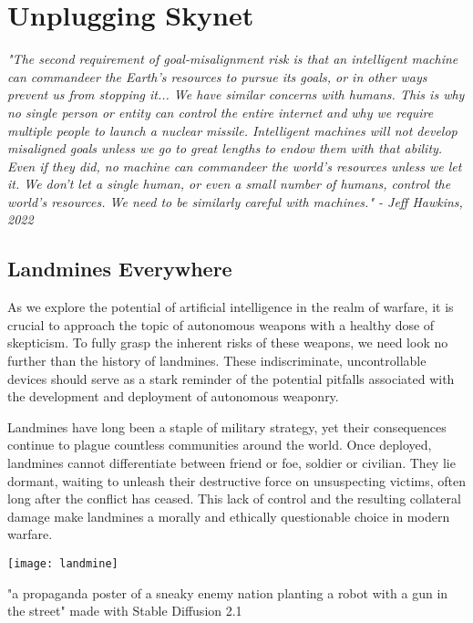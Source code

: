 \setchapterpreamble[u]{\margintoc}
\chapter{Unplugging Skynet}

\textit{"The second requirement of goal-misalignment risk is that an intelligent machine can commandeer the Earth's resources to pursue its goals, or in other ways prevent us from stopping it... We have similar concerns with humans. This is why no single person or entity can control the entire internet and why we require multiple people to launch a nuclear missile. Intelligent machines will not develop misaligned goals unless we go to great lengths to endow them with that ability. Even if they did, no machine can commandeer the world's resources unless we let it. We don't let a single human, or even a small number of humans, control the world's resources. We need to be similarly careful with machines." - Jeff Hawkins, 2022 \cite{hawkins2022}}

\section{Landmines Everywhere}

As we explore the potential of artificial intelligence in the realm of warfare, it is crucial to approach the topic of autonomous weapons with a healthy dose of skepticism. To fully grasp the inherent risks of these weapons, we need look no further than the history of landmines. These indiscriminate, uncontrollable devices should serve as a stark reminder of the potential pitfalls associated with the development and deployment of autonomous weaponry.

Landmines have long been a staple of military strategy, yet their consequences continue to plague countless communities around the world. Once deployed, landmines cannot differentiate between friend or foe, soldier or civilian. They lie dormant, waiting to unleash their destructive force on unsuspecting victims, often long after the conflict has ceased. This lack of control and the resulting collateral damage make landmines a morally and ethically questionable choice in modern warfare.

\begin{marginfigure}[-5.5cm]
        \texttt{[image: landmine]}
        \caption{"a propaganda poster of a sneaky enemy nation planting a robot with a gun in the street" made with Stable Diffusion 2.1}
\end{marginfigure}

